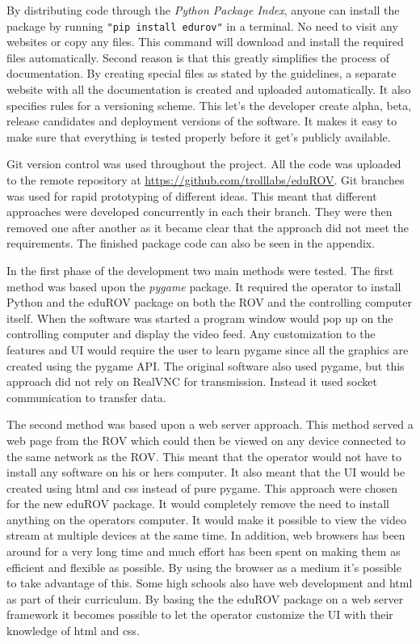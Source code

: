 By distributing code through the \emph{Python Package Index}, anyone can install the package by running \texttt{"pip install edurov"} in a terminal. No need to visit any websites or copy any files. This command will download and install the required files automatically. Second reason is that this greatly simplifies the process of documentation. By creating special files as stated by the guidelines, a separate website with all the documentation is created and uploaded automatically. It also specifies rules for a versioning scheme. This let's the developer create alpha, beta, release candidates and deployment versions of the software. It makes it easy to make sure that everything is tested properly before it get's publicly available.

Git version control was used throughout the project. All the code was uploaded to the remote repository at \url{https://github.com/trolllabs/eduROV}. Git branches was used for rapid prototyping of different ideas. This meant that different approaches were developed concurrently in each their branch. They were then removed one after another as it became clear that the approach did not meet the requirements. The finished package code can also be seen in the appendix.

In the first phase of the development two main methods were tested. The first method was based upon the \emph{pygame} package. It required the operator to install Python and the eduROV package on both the ROV and the controlling computer itself. When the software was started a program window would pop up on the controlling computer and display the video feed. Any customization to the features and UI would require the user to learn pygame since all the graphics are created using the pygame API. The original software also used pygame, but this approach did not rely on RealVNC for transmission. Instead it used socket communication to transfer data.

The second method was based upon a web server approach. This method served a web page from the ROV which could then be viewed on any device connected to the same network as the ROV. This meant that the operator would not have to install any software on his or hers computer. It also meant that the UI would be created using html and css instead of pure pygame. This approach were chosen for the new eduROV package. It would completely remove the need to install anything on the operators computer. It would make it possible to view the video stream at multiple devices at the same time. In addition, web browsers has been around for a very long time and much effort has been spent on making them as efficient and flexible as possible. By using the browser as a medium it's possible to take advantage of this. Some high schools also have web development and html as part of their curriculum. By basing the the eduROV package on a web server framework it becomes possible to let the operator customize the UI with their knowledge of html and css.

